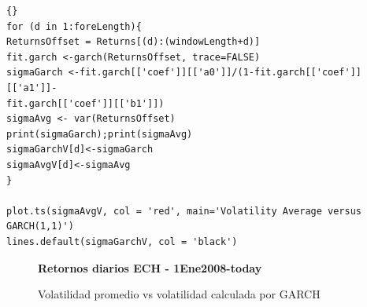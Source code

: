 \begin{lstlisting}[title={‘Código R: GARCH Ventanas móviles},basicstyle=\ttfamily]{}
for (d in 1:foreLength){
ReturnsOffset = Returns[(d):(windowLength+d)]
fit.garch <-garch(ReturnsOffset, trace=FALSE)
sigmaGarch <-fit.garch[['coef']][['a0']]/(1-fit.garch[['coef']][['a1']]-
fit.garch[['coef']][['b1']])
sigmaAvg <- var(ReturnsOffset)
print(sigmaGarch);print(sigmaAvg)
sigmaGarchV[d]<-sigmaGarch
sigmaAvgV[d]<-sigmaAvg
}

plot.ts(sigmaAvgV, col = 'red', main='Volatility Average versus GARCH(1,1)')
lines.default(sigmaGarchV, col = 'black')
\end{lstlisting}

\pagebreak\begin{figure}[H]
		\centering
		\textbf{Retornos diarios ECH - 1Ene2008-today}\par\medskip
		\caption{Volatilidad promedio vs volatilidad calculada por GARCH}\label{figVd41}
	\end{figure}
	

